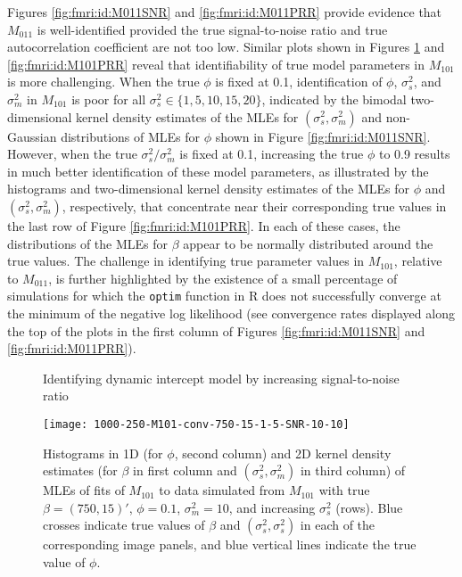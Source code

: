 Figures \ref{fig:fmri:id:M011SNR} and \ref{fig:fmri:id:M011PRR} provide evidence that $M_{011}$ is well-identified provided the true signal-to-noise ratio and true autocorrelation coefficient are not too low. Similar plots shown in Figures \ref{fig:fmri:id:M101SNR} and \ref{fig:fmri:id:M101PRR} reveal that identifiability of true model parameters in $M_{101}$ is more challenging. When the true $\phi$ is fixed at 0.1, identification of $\phi$, $\sigma^2_s$, and $\sigma^2_m$ in $M_{101}$ is poor for all $\sigma^2_s \in \{1,5,10,15,20\}$, indicated by the bimodal two-dimensional kernel density estimates of the MLEs for $(\sigma^2_s, \sigma^2_m)$ and non-Gaussian distributions of MLEs for $\phi$ shown in Figure \ref{fig:fmri:id:M011SNR}. However, when the true $\sigma^2_s / \sigma^2_m$ is fixed at 0.1, increasing the true $\phi$ to 0.9 results in much better identification of these model parameters, as illustrated by the histograms and two-dimensional kernel density estimates of the MLEs for $\phi$ and $(\sigma^2_s, \sigma^2_m)$, respectively, that concentrate near their corresponding true values in the last row of Figure \ref{fig:fmri:id:M101PRR}. In each of these cases, the distributions of the MLEs for $\beta$ appear to be normally distributed around the true values. The challenge in identifying true parameter values in $M_{101}$, relative to $M_{011}$, is further highlighted by the existence of a small percentage of simulations for which the {\tt optim} function in R does not successfully converge at the minimum of the negative log likelihood (see convergence rates displayed along the top of the plots in the first column of Figures \ref{fig:fmri:id:M011SNR} and \ref{fig:fmri:id:M011PRR}).

\begin{figure}
\ssp
\centering
\caption{Identifying dynamic intercept model by increasing signal-to-noise ratio} \label{fig:fmri:id:M101SNR}
\texttt{[image: 1000-250-M101-conv-750-15-1-5-SNR-10-10]}
\caption*{Histograms in 1D (for $\phi$, second column) and 2D kernel density estimates (for $\beta$ in first column and $(\sigma^2_s,\sigma^2_m)$ in third column) of MLEs of fits of $M_{101}$ to data simulated from $M_{101}$ with true $\beta = (750,15)'$, $\phi = 0.1$, $\sigma^2_m = 10$, and increasing $\sigma^2_s$ (rows). Blue crosses indicate true values of $\beta$ and $(\sigma^2_s,\sigma^2_s)$ in each of the corresponding image panels, and blue vertical lines indicate the true value of $\phi$.}
\end{figure}

